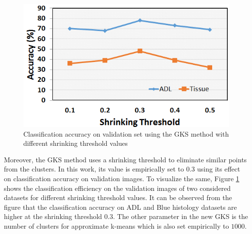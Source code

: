 \begin{figure}[h]
\centering
\includegraphics[scale=0.5]{Emp_up}
  \caption[Classification accuracy on validation set using the GKS method with different shrinking threshold values]{\fontsize{10}{12}\selectfont Classification accuracy on validation set using the GKS method with different shrinking threshold values}\label{ch3:fig:emp1}
\end{figure}
Moreover, the GKS method uses a shrinking threshold to eliminate similar points from the clusters. In this work, its value is empirically set to $0.3$ using its effect on classification accuracy on validation images. To visualize the same, Figure \ref{ch3:fig:emp1} shows the classification efficiency on the validation images of two considered datasets for different shrinking threshold values. It can be observed from the figure that the classification accuracy on ADL and Blue histology datasets are higher at the shrinking threshold $0.3$. The other parameter in the new GKS is the number of clusters for approximate k-means which is also set empirically to $1000$.
 

